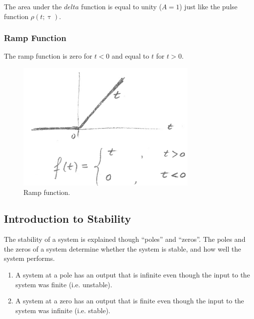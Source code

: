 \documentclass[12pt,letter]{article}
\numberwithin{ex}{section} %
\numberwithin{re}{section} %
\numberwithin{equation}{section}	%
\begin{document}
The area under the $delta$ function is equal to unity ($A=1$) just like the pulse function $\rho(t;\uptau)$.

\subsubsection{Ramp Function}

The ramp function is zero for $t<0$ and equal to $t$ for $t>0$. 

\begin{figure}[H]
	\centering
	\includegraphics[width=3.5in]{../figures/ramp_function.png}
	\caption{Ramp function.}
\end{figure}



	\subsection{Introduction to Stability}

	The stability of a system is explained though ``poles'' and ``zeros''. The poles and the zeros of a system determine whether the system is stable, and how well the system performs.

	\begin{enumerate}
		\item A system at a pole has an output that is infinite even though the input to the system was finite (i.e. unstable). 
		\item A system at a zero has an output that is finite even though the input to the system was infinite (i.e. stable).
	\end{enumerate}
 
\end{document}
